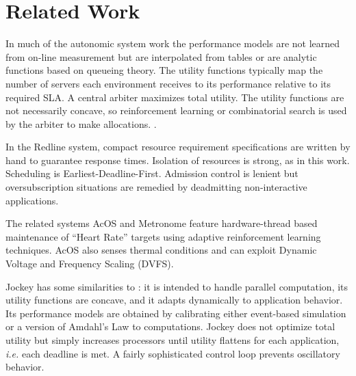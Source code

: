 \section{Related Work}

%	
%
%	
%
In much of the autonomic system work\cite{1078472,1078493,1285843,1345325}
the performance models are not learned from on-line measurement but are
interpolated from tables or are analytic functions based on queueing theory.
The utility functions typically map the number of servers each environment receives
to its performance relative to its required SLA.
A central arbiter maximizes total utility. The utility functions are not necessarily concave,
so reinforcement learning or combinatorial search is used by the arbiter to make allocations. .

%
In the Redline system\cite{Redline}, compact resource requirement specifications are written by hand to guarantee response times.
Isolation of resources is strong, as in this work.  Scheduling is Earliest-Deadline-First.
Admission control is lenient but oversubscription situations are remedied by deadmitting non-interactive applications.

%
%
The related systems AcOS\cite{AcOS} and Metronome\cite{Metronome} feature hardware-thread based maintenance of ``Heart Rate''
targets using adaptive reinforcement learning techniques.
AcOS also senses thermal conditions and can exploit Dynamic Voltage and Frequency Scaling (DVFS).

%
Jockey\cite{Jockey} has some similarities to \pacora: it is intended to handle parallel computation, its utility functions are concave,
and it adapts dynamically to application behavior.
Its performance models are obtained by calibrating either event-based simulation or a version of Amdahl's Law to computations.
Jockey does not optimize total utility but simply increases processors until utility flattens for each application,
\emph{i.e.} each deadline is met.
A fairly sophisticated control loop prevents oscillatory behavior.

